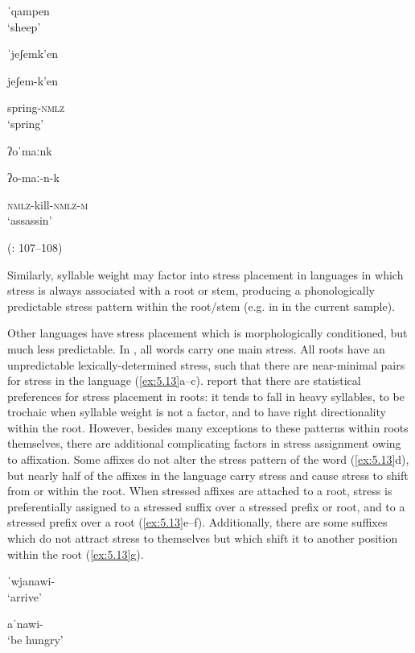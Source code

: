 \ea\label{ex:5.12}

\ea  ˈqampen\\
\glt ‘sheep’

\ex  ˈjeʃemk’en

jeʃem-k’en

spring-\textsc{nmlz}\\
\glt ‘spring’

\ex   ʔoˈmaːnk

ʔo-maː-n-k

\textsc{nmlz}-kill-\textsc{nmlz-m}\\
\glt ‘assassin’

(\citealt{FernándezGaray1998}: 107--108)
\z
\z

Similarly, syllable weight may factor into stress placement in languages in which stress is always associated with a root or stem, producing a phonologically predictable stress pattern within the root/stem (e.g. in  in the current sample).

  Other languages have stress placement which is morphologically conditioned, but much less predictable. In , all words carry one main stress. All roots have an unpredictable lexically-determined stress, such that there are near-minimal pairs for stress in the language (\ref{ex:5.13}a--c). \citet{HargusBeavert2005} report that there are statistical preferences for stress placement in roots: it tends to fall in heavy syllables, to be trochaic when syllable weight is not a factor, and to have right directionality within the root. However, besides many exceptions to these patterns within roots themselves, there are additional complicating factors in stress assignment owing to affixation. Some affixes do not alter the stress pattern of the word (\ref{ex:5.13}d), but nearly half of the affixes in the language carry stress and cause stress to shift from or within the root. When stressed affixes are attached to a root, stress is preferentially assigned to a stressed suffix over a stressed prefix or root, and to a stressed prefix over a root (\ref{ex:5.13}e--f). Additionally, there are some suffixes which do not attract stress to themselves but which shift it to another position within the root (\ref{ex:5.13}g).

\ea\label{ex:5.13}

\ea  ˈwjanawi-\\
\glt ‘arrive’

\ex  aˈnawi-\\
\glt ‘be hungry’

